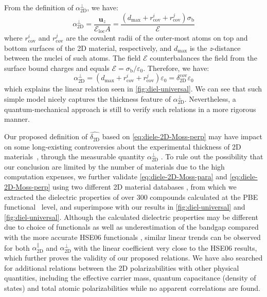 From the definition of
$\alpha_{\mathrm{2D}}^{\perp}$, we have:
\begin{equation}
  \label{eq:alpha-classic}
  \alpha_{\mathrm{2D}}^{\perp} = \frac{\symbf{u}_{z}}{\mathcal{E}_{\mathrm{loc}} A}
  = \frac{(d_{\mathrm{max}} + r_{\mathrm{cov}}^{i} + r_{\mathrm{cov}}^{j}) \sigma_{\mathrm{b}}}{\mathscr{E}}
\end{equation}
where $r_{\mathrm{cov}}^{i}$ and $r_{\mathrm{cov}}^{j}$ are the
covalent radii of the outer-most atoms on top and bottom surfaces of
the 2D material, respectively, and $d_{\mathrm{max}}$ is the
\textit{z}-distance between the nuclei of such atoms.  The field $\mathcal{E}$
counterbalances the field from the surface bound charges and equals
$\mathcal{E} = \sigma_{\mathrm{b}}/\varepsilon_{0}$. Therefore, we have:
\begin{equation}
  \label{eq:alpha-classic-2}
  \alpha_{\mathrm{2D}}^{\perp} = (d_{\mathrm{max}} + r_{\mathrm{cov}}^{i} + r_{\mathrm{cov}}^{j})\varepsilon_{0}
                = \delta_{\mathrm{2D}}^{\mathrm{cov}} \varepsilon_{0}
\end{equation}
which explains the linear relation seen in
\autoref{fig:diel-universal}. We can see that such simple model
nicely captures the thickness feature of
$\alpha_{\mathrm{2D}}^{\perp}$. Nevertheless, a quantum-mechanical
approach is still to verify such relations in a more rigorous manner.


Our proposed definition of
$\hat{\delta_{\mathrm{2D}}}$  based on
\autoref{eq:diele-2D-Moss-perp} may have impact on some long-existing
controversies about the experimental thickness of 2D
materials~\autocite{Shearer_2016}, through the measurable quantity
$\alpha_{\mathrm{2D}}^{\perp}$
\autocite{Antoine_1999_polariz_C60,Cherniavskaya_2003_nanocryst_polariz,Krauss_1999_EFM}.
% 
%
To rule out the possibility that our conclusion are limited by the
number of materials due to the high computation expenses, we further
validate \autoref{eq:diele-2D-Moss-para} and
\autoref{eq:diele-2D-Moss-perp} using two different 2D material
databases \autocite{Haastrup_2018_database,Mounet_2018_database}, from
which we extracted the dielectric properties of over 300 compounds
calculated at the PBE functional~\autocite{Perdew_1996_GGA} level, and
superimpose with our results in \autoref{fig:diel-universal} and
\autoref{fig:diel-universal}. Although the calculated dielectric
properties may be different due to choice of functionals as well as
underestimation of the bandgap compared with the more accurate HSE06
functionals \autocite{Van_Dyck_2017}, similar linear trends can be
observed for both $\alpha^{\parallel}_{\mathrm{2D}}$ and
$\alpha_{\mathrm{2D}}^{\perp}$ with the linear coefficient very close
to the HSE06 results, which further proves the validity of our
proposed relations. We have also searched for additional relations
between the 2D polarizabilities with other physical quantities,
including the effective carrier mass, quantum capacitance (density of
states) and total atomic polarizabilities while no apparent
correlations are found.

